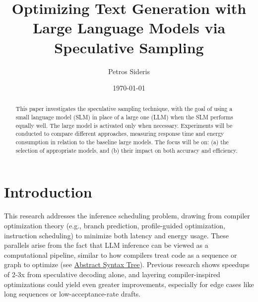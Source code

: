 \documentclass[draft,a4paper,12pt]{report}
\title{Optimizing Text Generation with Large Language Models via Speculative Sampling}
\author{Petros Sideris}
\date{\today}
\begin{document}
\maketitle

\begin{abstract}
This paper investigates the speculative sampling technique, with the goal of using a small language model (SLM) in place of a large one (LLM) when the SLM performs equally well. The large model is activated only when necessary. Experiments will be conducted to compare different approaches, measuring response time and energy consumption in relation to the baseline large models. The focus will be on: (a) the selection of appropriate models, and (b) their impact on both accuracy and efficiency.
\end{abstract}

\tableofcontents

\chapter{Introduction}
This research addresses the inference scheduling problem, drawing from compiler optimization theory (e.g., branch prediction, profile-guided optimization, instruction scheduling) to minimize both latency and energy usage. These parallels arise from the fact that LLM inference can be viewed as a computational pipeline, similar to how compilers treat code as a sequence or graph to optimize (see \href{https://en.wikipedia.org/wiki/Abstract_syntax_tree}{Abstract Syntax Tree}). Previous research shows speedups of 2-3x from speculative decoding alone, and layering compiler-inspired optimizations could yield even greater improvements, especially for edge cases like long sequences or low-acceptance-rate drafts.
\end{document}
